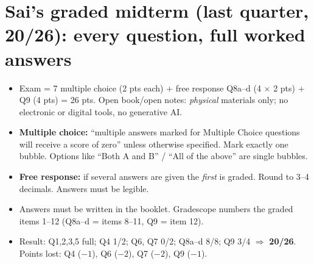 \section{Sai's graded midterm (last quarter, 20/26): every question, full worked answers}

\begin{keybox}
\begin{itemize}[leftmargin=1em]
\item Exam = 7 multiple choice (2 pts each) + free response Q8a--d (4 $\times$ 2 pts) + Q9 (4 pts) = 26 pts. Open book/open notes:
  \emph{physical} materials only; no electronic or digital tools, no generative AI.
\item \textbf{Multiple choice:} ``multiple answers marked for Multiple Choice questions will receive a score of zero'' unless
  otherwise specified. Mark exactly one bubble. Options like ``Both A and B'' / ``All of the above'' are single bubbles.
\item \textbf{Free response:} if several answers are given the \emph{first} is graded. Round to 3--4 decimals. Answers must be legible.
\item Answers must be written in the booklet. Gradescope numbers the graded items 1--12 (Q8a--d = items 8--11, Q9 = item 12).
\item Result: Q1,2,3,5 full; Q4 1/2; Q6, Q7 0/2; Q8a--d 8/8; Q9 3/4 $\Rightarrow$ \textbf{20/26}. Points lost: Q4 ($-1$), Q6 ($-2$), Q7 ($-2$), Q9 ($-1$).
\end{itemize}
\end{keybox}

